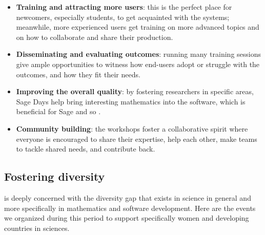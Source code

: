 \documentclass{deliverablereport}
\begin{document}
\begin{itemize}
\item \textbf{Training and attracting more users}: this is the perfect
  place for newcomers, especially students, to get acquainted with the
  systems; meanwhile, more experienced users get training on more
  advanced topics and on how to collaborate and share their
  production.

\item \textbf{Disseminating and evaluating \ODK outcomes}: running
  many training sessions give ample opportunities to witness how
  end-users adopt or struggle with the \ODK outcomes, and how they fit
  their needs.

\item \textbf{Improving the overall quality}: by fostering researchers
  in specific areas, Sage Days help bring interesting mathematics into
  the software, which is beneficial for Sage and so \ODK.

\item \textbf{Community building}: the workshops foster a
  collaborative spirit where everyone is encouraged to share their
  expertise, help each other, make teams to tackle shared needs, and
  contribute back.
\end{itemize}



















\subsection{Fostering diversity}

\ODK is deeply concerned with the diversity gap that exists in science
in general and more specifically in mathematics and software
development. Here are the events we organized during this period to
support specifically women and developing countries in sciences.


\end{document}
